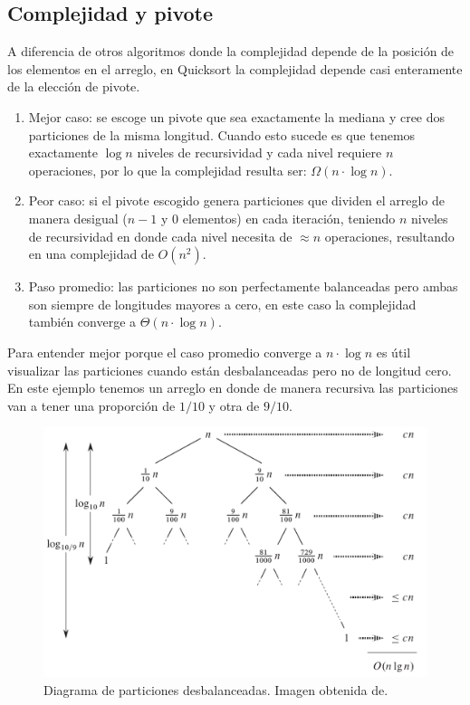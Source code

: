 \documentclass[conference]{IEEEtran}
\begin{document}
\subsection{Complejidad y pivote}
A diferencia de otros algoritmos donde la complejidad depende de la posición de los elementos en el arreglo, en Quicksort la complejidad depende casi enteramente de la elección de pivote.\cite{pivot}
\begin{enumerate}
    \item Mejor caso: se escoge un pivote que sea exactamente la mediana y cree dos particiones de la misma longitud.
Cuando esto sucede es que tenemos exactamente $\log{n}$ niveles de recursividad y cada nivel requiere $n$ operaciones, por lo que la complejidad resulta ser: $\Omega(n\cdot \log{n})$.
    \item Peor caso: si el pivote escogido genera particiones que dividen el arreglo de manera desigual ($n-1$ y $0$ elementos) en cada iteración, 
    teniendo $n$ niveles de recursividad en donde cada nivel necesita de $\approx n$ operaciones,
    resultando en una complejidad de $O(n^2)$.
    \item Paso promedio: las particiones no son perfectamente balanceadas pero ambas son siempre de longitudes mayores a cero, en este caso la complejidad también converge a $\Theta(n\cdot \log{n})$.
\end{enumerate}

Para entender mejor porque el caso promedio converge a $n \cdot\log{n}$ es útil visualizar las particiones cuando están desbalanceadas pero no de longitud cero.
En este ejemplo tenemos un arreglo en donde de manera recursiva las particiones van a tener una proporción de $1/10$ y otra de $9/10$.

\begin{figure}[H]
    \centering
    \includegraphics[scale=0.3]{convergence_avg_case.png}
    \caption{Diagrama de particiones desbalanceadas. Imagen obtenida de\cite{intro_algo}.}\label{fig:avg_case}
\end{figure}
\end{document}
